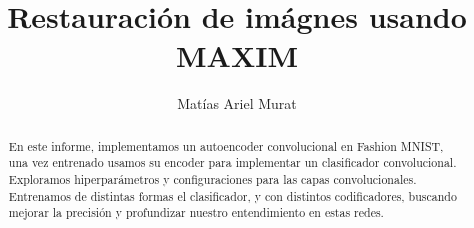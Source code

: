 \documentclass[aps,prl,twocolumn,groupedaddress]{revtex4-2}
\begin{document}

\title{
Restauración de imágnes usando MAXIM
}


\author{Matías Ariel Murat}



\begin{abstract}
En este informe, implementamos un autoencoder convolucional en Fashion MNIST, una vez entrenado usamos su encoder para implementar un clasificador convolucional. Exploramos hiperparámetros y configuraciones para las capas convolucionales. Entrenamos de distintas formas el clasificador, y con distintos codificadores, buscando mejorar la precisión y profundizar nuestro entendimiento en estas redes.
\end{abstract}


\maketitle
\end{document}
